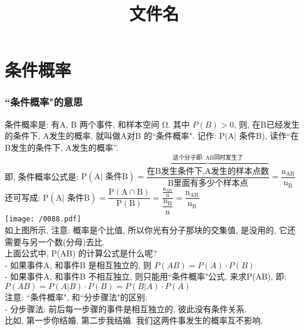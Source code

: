 \documentclass[UTF8]{ctexart}
\title{文件名}
\begin{document}
	\tableofcontents %
	\date{} %
	\maketitle  %
	
	
	
	\part{条件概率}
	
	\section{``条件概率"的意思}
	
	条件概率是: 有A, B 两个事件, 和样本空间 Ω. 其中 $P(B) >0$, 则, 在B已经发生的条件下, A发生的概率, 就叫做A对B 的``条件概率". 记作:  P(A| 条件B), 读作``在B发生的条件下, A发生的概率”. \\
	
	即, 条件概率公式是: $
	\text{P}\left( \text{A|\ 条件B} \right) =\dfrac{\overset{\text{这个分子即:\ AB同时发生了}}{\overbrace{\text{在B发生条件下,A发生的样本点数}}}}{\text{B里面有多少个样本点}}=\dfrac{\text{n}_{\text{AB}}}{\text{n}_{\text{B}}}
	$ \\
	
	还可写成:  $
	\text{P}\left( \text{A|\ 条件B} \right) 
	=\dfrac{\text{P}\left( \text{A}\cap \text{B} \right)}{\text{P}\left( \text{B} \right)}
	=\dfrac{\frac{\text{n}_{\text{AB}}}{\text{n}}}{\dfrac{\text{n}_{\text{B}}}{\text{n}}}=\dfrac{\text{n}_{\text{AB}}}{\text{n}_{\text{B}}}
		$ \\
	
	\texttt{[image: /0088.pdf]} \\
	
	如上图所示, 注意: 概率是个比值, 所以你光有分子那块的交集值, 是没用的, 它还需要与另一个数(分母)去比. \\
	
	上面公式中, P(AB) 的计算公式是什么呢? \\
	- 如果事件A, 和事件B 是相互独立的, 则 $P(AB) = P(A) \cdot P(B)$ \\
	- 如果事件A, 和事件B 不相互独立, 则只能用``条件概率"公式, 来求P(AB), 即: $P(AB) = P(A |B) \cdot P(B) = P(B |A) \cdot P(A) $   \\
	
	
	
	注意: ``条件概率", 和``分步骤法"的区别: \\
	- 分步骤法: 前后每一步骤的事件是相互独立的, 彼此没有条件关系.  \\
	比如, 第一步你结婚, 第二步我结婚. 我们这两件事发生的概率互不影响. \\
	
\end{document}
